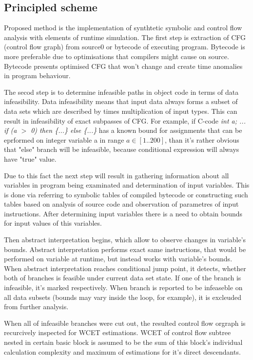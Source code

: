 \documentclass[10pt, conference, compsocconf]{IEEEtran}
\begin{document}
\subsection{Principled scheme}
Proposed method is the implementation of synthtetic symbolic and control flow analysis with elements of runtime simulation.
The first step is extraction of CFG (control flow graph) from source0 or bytecode of executing program.
Bytecode is more preferable due to optimisations that compilers might cause on source. Bytecode presents optimised CFG that won't change and create time anomalies in program behaviour.

The secod step is to determine infeasible paths in object code in terms of data infeasibility.
Data infeasibility means that input data always forms a subset of data sets which are described by times multiplication of input types.
This can result in infeasibility of exact subpasses of CFG.
For example, if C-code {\slshape int a; ... if (a $>$ 0) then \{...\} else \{...\} } has a known bound for assignments that can be eprformed on integer variable a in range $a \in [1 .. 200]$,
than it's rather obvious that "else" branch will be infeasible, because conditional expression will always have "true" value. 

Due to this fact the next step will result in gathering information about all variables in program being examinated and determination of input variables.
This is done via referring to symbolic tables of compiled bytecode or constructing such tables based on analysis of source code and observation of parametres of input instructions.
After determining input variables there is a need to obtain bounds for input values of this variables.

Then abstract interpretation begins, which allow to observe changes in variable's bounds.
Abstract interpretation performs exact same instructions, that would be performed on variable at runtime, but instead works with variable's bounds.
When abstract interpretation reaches conditional jump point, it detects, whether both of branches is feasible under current data set state.
If one of the branch is infeasible, it's marked respectively.
When branch is reported to be infeaseble on all data subsets (bounds may vary inside the loop, for example), it is excleuded from further analysis. 

When all of infeasible branches were cut out, the resulted control flow orgraph is recurcively inspected for WCET estimations. 
WCET of control flow subtree nested in certain basic block is assumed to be the sum of this block's individual calculation complexity and maximum of estimations for it's direct descendants.
\end{document}
